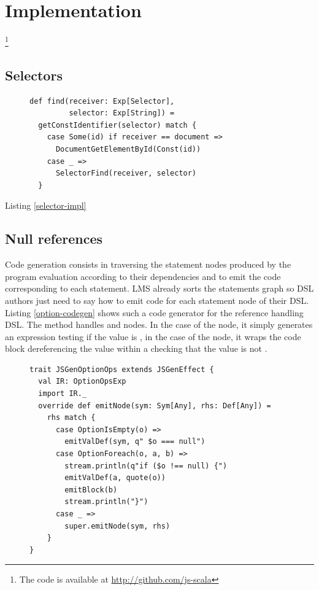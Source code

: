 \documentclass[preprint]{sigplanconf}
\begin{document}
\section{Implementation}
\label{implementation}

\footnote{The code is available at \href{http://github.com/js-scala}{http://github.com/js-scala}}

\subsection{Selectors}

\begin{figure}
\begin{lstlisting}[label=selector-impl,caption=Selectors optimization]
def find(receiver: Exp[Selector],
         selector: Exp[String]) =
  getConstIdentifier(selector) match {
    case Some(id) if receiver == document =>
      DocumentGetElementById(Const(id))
    case _ =>
      SelectorFind(receiver, selector)
  }
\end{lstlisting}
\end{figure}

Listing \ref{selector-impl}

\subsection{Null references}

Code generation consists in traversing the statement nodes produced by the program evaluation according to their
dependencies and to emit the code corresponding to each statement. LMS already sorts the statements graph so DSL
authors just need to say how to emit code for each statement node of their DSL. Listing \ref{option-codegen} shows
such a code generator for the  reference handling DSL. The  method handles
 and  nodes. In the case of the  node, it simply
generates an expression testing if the value is , in the case of the  node, it wraps
the code block dereferencing the value within a  checking that the value is not .

\begin{figure}
\begin{lstlisting}[caption=Null reference handling DSL code generator,label=option-codegen]
trait JSGenOptionOps extends JSGenEffect {
  val IR: OptionOpsExp
  import IR._
  override def emitNode(sym: Sym[Any], rhs: Def[Any]) =
    rhs match {
      case OptionIsEmpty(o) =>
        emitValDef(sym, q" $o === null")
      case OptionForeach(o, a, b) =>
        stream.println(q"if ($o !== null) {")
        emitValDef(a, quote(o))
        emitBlock(b)
        stream.println("}")
      case _ =>
        super.emitNode(sym, rhs)
    }
}
\end{lstlisting}
\end{figure}
\end{document}
